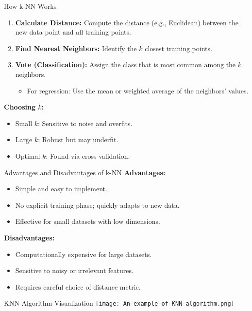 \documentclass[serif, aspectratio=169]{beamer}
\begin{document}
\begin{frame}{How k-NN Works}
    \begin{enumerate}
        \item \textbf{Calculate Distance:} Compute the distance (e.g., Euclidean) between the new data point and all training points.
        \item \textbf{Find Nearest Neighbors:} Identify the $k$ closest training points.
        \item \textbf{Vote (Classification):} Assign the class that is most common among the $k$ neighbors.
        \begin{itemize}
            \item For regression: Use the mean or weighted average of the neighbors' values.
        \end{itemize}
    \end{enumerate}

    \textbf{Choosing $k$:}
    \begin{itemize}
        \item Small $k$: Sensitive to noise and overfits.
        \item Large $k$: Robust but may underfit.
        \item Optimal $k$: Found via cross-validation.
    \end{itemize}
\end{frame}

\begin{frame}{Advantages and Disadvantages of k-NN}
    \textbf{Advantages:}
    \begin{itemize}
        \item Simple and easy to implement.
        \item No explicit training phase; quickly adapts to new data.
        \item Effective for small datasets with low dimensions.
    \end{itemize}

    \textbf{Disadvantages:}
    \begin{itemize}
        \item Computationally expensive for large datasets.
        \item Sensitive to noisy or irrelevant features.
        \item Requires careful choice of distance metric.
    \end{itemize}
\end{frame}

\begin{frame}{KNN Algorithm Visualization}
    \hspace*{\fill}
    \texttt{[image: An-example-of-KNN-algorithm.png]}
    \hspace*{\fill}
\end{frame}
\end{document}
